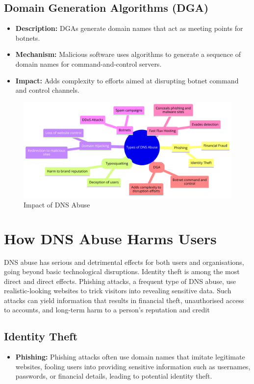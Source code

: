 \subsection{Domain Generation Algorithms (DGA)}
\begin{itemize}
    \item \textbf{Description:} DGAs generate domain names that act as meeting points for botnets.\cite{antonakakis2012throw}
    \item \textbf{Mechanism:} Malicious software uses algorithms to generate a sequence of domain names for command-and-control servers.
    \item \textbf{Impact:} Adds complexity to efforts aimed at disrupting botnet command and control channels.
\end{itemize}

\begin{figure}[ht]
\centering
\includegraphics[width=1.0\textwidth]{background/DNSabuseForms.png}
\caption{Impact of DNS Abuse}
\label{fig:figureThree}
\end{figure}



\section{How DNS Abuse Harms Users}

DNS abuse has serious and detrimental effects for both users and organisations, going beyond basic technological disruptions. Identity theft is among the most direct and direct effects. Phishing attacks, a frequent type of DNS abuse, use realistic-looking websites to trick visitors into revealing sensitive data. Such attacks can yield information that results in financial theft, unauthorised access to accounts, and long-term harm to a person's reputation and credit

\subsection{Identity Theft}
\begin{itemize}
    \item \textbf{Phishing:} Phishing attacks often use domain names that imitate legitimate websites, fooling users into providing sensitive information such as usernames, passwords, or financial details, leading to potential identity theft.\cite{godaddy2023dnsabuse, jakobsson2006phishing}
\end{itemize}

